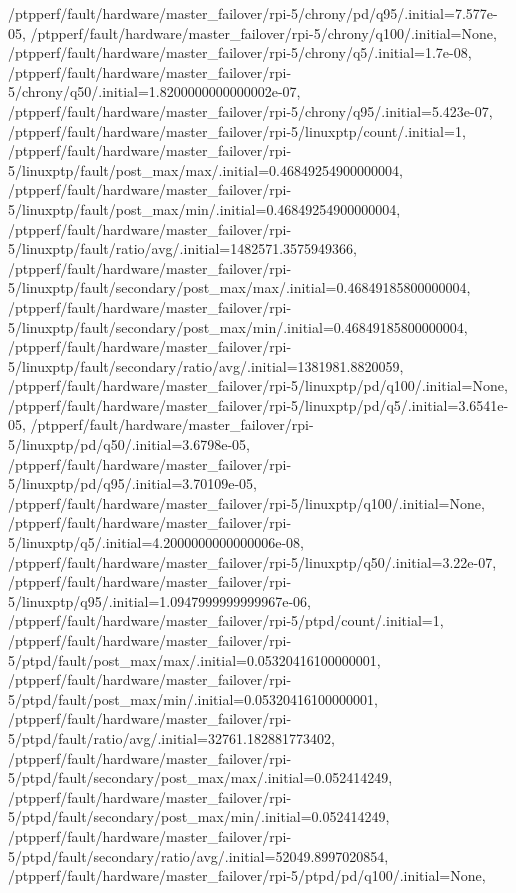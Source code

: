 {    /ptpperf/fault/hardware/master_failover/rpi-5/chrony/pd/q95/.initial=7.577e-05,
    /ptpperf/fault/hardware/master_failover/rpi-5/chrony/q100/.initial=None,
    /ptpperf/fault/hardware/master_failover/rpi-5/chrony/q5/.initial=1.7e-08,
    /ptpperf/fault/hardware/master_failover/rpi-5/chrony/q50/.initial=1.8200000000000002e-07,
    /ptpperf/fault/hardware/master_failover/rpi-5/chrony/q95/.initial=5.423e-07,
    /ptpperf/fault/hardware/master_failover/rpi-5/linuxptp/count/.initial=1,
    /ptpperf/fault/hardware/master_failover/rpi-5/linuxptp/fault/post_max/max/.initial=0.46849254900000004,
    /ptpperf/fault/hardware/master_failover/rpi-5/linuxptp/fault/post_max/min/.initial=0.46849254900000004,
    /ptpperf/fault/hardware/master_failover/rpi-5/linuxptp/fault/ratio/avg/.initial=1482571.3575949366,
    /ptpperf/fault/hardware/master_failover/rpi-5/linuxptp/fault/secondary/post_max/max/.initial=0.46849185800000004,
    /ptpperf/fault/hardware/master_failover/rpi-5/linuxptp/fault/secondary/post_max/min/.initial=0.46849185800000004,
    /ptpperf/fault/hardware/master_failover/rpi-5/linuxptp/fault/secondary/ratio/avg/.initial=1381981.8820059,
    /ptpperf/fault/hardware/master_failover/rpi-5/linuxptp/pd/q100/.initial=None,
    /ptpperf/fault/hardware/master_failover/rpi-5/linuxptp/pd/q5/.initial=3.6541e-05,
    /ptpperf/fault/hardware/master_failover/rpi-5/linuxptp/pd/q50/.initial=3.6798e-05,
    /ptpperf/fault/hardware/master_failover/rpi-5/linuxptp/pd/q95/.initial=3.70109e-05,
    /ptpperf/fault/hardware/master_failover/rpi-5/linuxptp/q100/.initial=None,
    /ptpperf/fault/hardware/master_failover/rpi-5/linuxptp/q5/.initial=4.2000000000000006e-08,
    /ptpperf/fault/hardware/master_failover/rpi-5/linuxptp/q50/.initial=3.22e-07,
    /ptpperf/fault/hardware/master_failover/rpi-5/linuxptp/q95/.initial=1.0947999999999967e-06,
    /ptpperf/fault/hardware/master_failover/rpi-5/ptpd/count/.initial=1,
    /ptpperf/fault/hardware/master_failover/rpi-5/ptpd/fault/post_max/max/.initial=0.05320416100000001,
    /ptpperf/fault/hardware/master_failover/rpi-5/ptpd/fault/post_max/min/.initial=0.05320416100000001,
    /ptpperf/fault/hardware/master_failover/rpi-5/ptpd/fault/ratio/avg/.initial=32761.182881773402,
    /ptpperf/fault/hardware/master_failover/rpi-5/ptpd/fault/secondary/post_max/max/.initial=0.052414249,
    /ptpperf/fault/hardware/master_failover/rpi-5/ptpd/fault/secondary/post_max/min/.initial=0.052414249,
    /ptpperf/fault/hardware/master_failover/rpi-5/ptpd/fault/secondary/ratio/avg/.initial=52049.8997020854,
    /ptpperf/fault/hardware/master_failover/rpi-5/ptpd/pd/q100/.initial=None,
}
